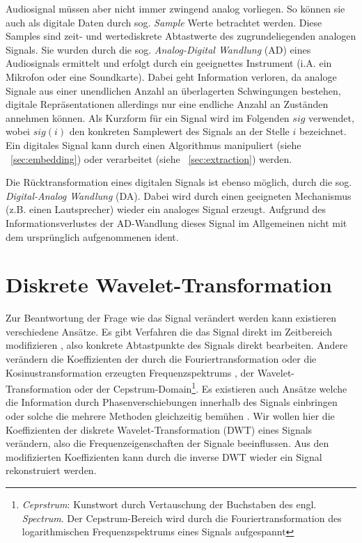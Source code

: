Audiosignal müssen aber nicht immer zwingend analog vorliegen. So können sie auch als digitale Daten durch sog. \textit{Sample} Werte betrachtet werden. Diese Samples sind zeit- und wertediskrete Abtastwerte des zugrundeliegenden analogen Signals. Sie wurden durch die sog. \textit{Analog-Digital Wandlung} (AD) eines Audiosignals ermittelt und erfolgt durch ein geeignettes Instrument (i.A. ein Mikrofon oder eine Soundkarte). Dabei geht Information verloren, da analoge Signale aus einer unendlichen Anzahl an \"uberlagerten Schwingungen bestehen, digitale Repr\"asentationen allerdings nur eine endliche Anzahl an Zust\"anden annehmen k\"onnen. Als Kurzform für ein Signal wird im Folgenden $sig$ verwendet, wobei $sig(i)$ den konkreten Samplewert des Signals an der Stelle $i$ bezeichnet. Ein digitales Signal kann durch einen Algorithmus manipuliert (siehe ~\ref{sec:embedding}) oder verarbeitet (siehe ~\ref{sec:extraction}) werden.

Die Rücktransformation eines digitalen Signals ist ebenso möglich, durch die sog. \textit{Digital-Analog Wandlung} (DA). Dabei wird durch einen geeigneten Mechanismus (z.B. einen Lautsprecher) wieder ein analoges Signal erzeugt. Aufgrund des Informationsverlustes der AD-Wandlung dieses Signal im Allgemeinen nicht mit dem urspr\"unglich aufgenommenen ident. 


\section{Diskrete Wavelet-Transformation} 
 
	
Zur Beantwortung der Frage wie das Signal ver\"andert werden kann existieren verschiedene Ans\"atze. Es gibt Verfahren die das Signal direkt im Zeitbereich modifizieren \cite{bassia2001robust}\cite{lie2006robust}, also konkrete Abtastpunkte des Signals direkt bearbeiten. Andere ver\"andern die Koeffizienten der durch die Fouriertransformation oder die Kosinustransformation erzeugten Frequenzspektrums \cite{chang2012location}, der Wavelet-Transformation\cite{tang2005digital} oder der Cepstrum-Domain\footnote{\textit{Ceprstrum}: Kunstwort durch Vertauschung der Buchstaben des engl. \textit{Spectrum}. Der Cepstrum-Bereich wird durch die Fouriertransformation des logarithmischen Frequenzspektrums eines Signals aufgespannt}\cite{lee2000digital}\cite{li2000transparent}. Es existieren auch Ans\"atze welche die Information durch Phasenverschiebungen innerhalb des Signals einbringen \cite{dong2004data}\cite{ansari2004data} oder solche die mehrere Methoden gleichzeitig bem\"uhen \cite{chang2012location}\cite{lei2012multipurpose}. Wir wollen hier die Koeffizienten der diskrete Wavelet-Transformation (DWT) eines Signals ver\"andern, also die Frequenzeigenschaften der Signale beeinflussen. Aus den modifizierten Koeffizienten kann durch die inverse DWT wieder ein Signal rekonstruiert werden. 
	
